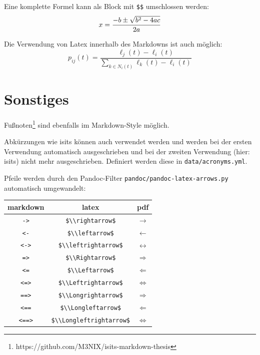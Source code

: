 \documentclass[
  11pt,
  a4paper,
  openright,
  cleardoublepage=plain,
  parskip=half+, %
]{scrreprt}
\newcommand{\passthrough}[1]{#1}
\begin{document}
Eine komplette Formel kann als Block mit \passthrough{\lstinline!$$!}
umschlossen werden: \[
x = {-b \pm \sqrt{b^2-4ac} \over 2a}
\]

Die Verwendung von Latex innerhalb des Markdowns ist auch möglich:
\begin{equation}\label{eq:neighbor-propability}
    p_{ij}(t) = \frac{\ell_j(t) - \ell_i(t)}{\sum_{k \in N_i(t)}^{} \ell_k(t) - \ell_i(t)}
\end{equation}

\hypertarget{sonstiges}{%
\section{Sonstiges}\label{sonstiges}}

Fußnoten\footnote{https://github.com/M3NIX/isits-markdown-thesis} sind
ebenfalls im Markdown-Style möglich.

Abkürzungen wie \ac{isits} können auch verwendet werden und werden bei
der ersten Verwendung automatisch ausgeschrieben und bei der zweiten
Verwendung (hier: \ac{isits}) nicht mehr ausgeschrieben. Definiert
werden diese in \passthrough{\lstinline!data/acronyms.yml!}.

Pfeile werden durch den Pandoc-Filter
\passthrough{\lstinline!pandoc/pandoc-latex-arrows.py!} automatisch
umgewandelt:

\begin{longtable}[]{@{}ccc@{}}
\toprule\noalign{}
markdown & latex & pdf \\
\midrule\noalign{}
\endhead
\bottomrule\noalign{}
\endlastfoot
\passthrough{\lstinline!->!} & \passthrough{\lstinline!$\\rightarrow$!}
& $\rightarrow$ \\
\passthrough{\lstinline!<-!} & \passthrough{\lstinline!$\\leftarrow$!} &
$\leftarrow$ \\
\passthrough{\lstinline!<->!} &
\passthrough{\lstinline!$\\leftrightarrow$!} & $\leftrightarrow$ \\
\passthrough{\lstinline!=>!} & \passthrough{\lstinline!$\\Rightarrow$!}
& $\Rightarrow$ \\
\passthrough{\lstinline!<=!} & \passthrough{\lstinline!$\\Leftarrow$!} &
$\Leftarrow$ \\
\passthrough{\lstinline!<=>!} &
\passthrough{\lstinline!$\\Leftrightarrow$!} & $\Leftrightarrow$ \\
\passthrough{\lstinline!==>!} &
\passthrough{\lstinline!$\\Longrightarrow$!} & $\Longrightarrow$ \\
\passthrough{\lstinline!<==!} &
\passthrough{\lstinline!$\\Longleftarrow$!} & $\Longleftarrow$ \\
\passthrough{\lstinline!<==>!} &
\passthrough{\lstinline!$\\Longleftrightarrow$!} &
$\Longleftrightarrow$ \\
\end{longtable}
\end{document}
